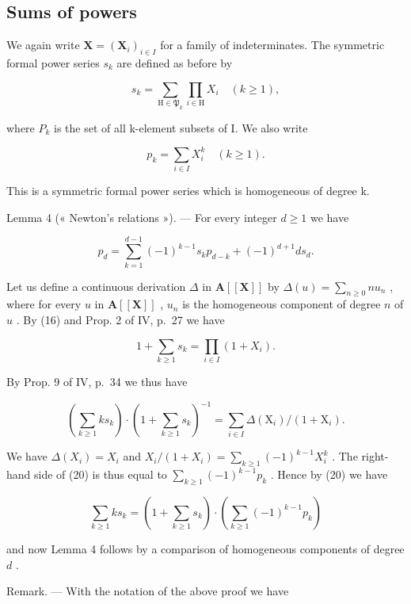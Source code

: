 \subsection{Sums of powers}

We again write \(\mathbf{X} = (\mathbf{X}_{i})_{i \in I}\) for a family of indeterminates. The symmetric formal power series \(s_{k}\) are defined as before by

\[
s _ {k} = \sum_ {\mathrm{H} \in \mathfrak {P} _ {k}} \prod_ {i \in \mathrm{H}} X _ {i} \quad (k \geqslant 1),\tag{16}
\]

where \(P_{k}\) is the set of all k-element subsets of I. We also write

\[
p _ {k} = \sum_ {i \in I} X _ {i} ^ {k} \quad (k \geqslant 1).\tag{17}
\]

This is a symmetric formal power series which is homogeneous of degree k.

Lemma 4 (« Newton's relations »). --- For every integer \(d \geqslant 1\) we have

\[
p _ {d} = \sum_ {k = 1} ^ {d - 1} (- 1) ^ {k - 1} s _ {k} p _ {d - k} + (- 1) ^ {d + 1} d s _ {d}.\tag{18}
\]

Let us define a continuous derivation \(\Delta\) in \(\mathbf{A}[[\mathbf{X}]]\) by \(\Delta(u) = \sum_{n \geq 0} nu_n\) , where for every \(u\) in \(\mathbf{A}[[\mathbf{X}]]\) , \(u_n\) is the homogeneous component of degree \(n\) of \(u\) . By (16) and Prop. 2 of IV, p.~27 we have

\[
1 + \sum_ {k \geqslant 1} s _ {k} = \prod_ {i \in I} (1 + X _ {i}).\tag{19}
\]

By Prop. 9 of IV, p.~34 we thus have

\[
\left(\sum_ {k \geqslant 1} k s _ {k}\right) \cdot \left(1 + \sum_ {k \geqslant 1} s _ {k}\right) ^ {- 1} = \sum_ {i \in I} \Delta \left(\mathrm{X} _ {i}\right) / \left(1 + \mathrm{X} _ {i}\right).\tag{20}
\]

We have \(\Delta(X_i) = X_i\) and \(X_i / (1 + X_i) = \sum_{k \geq 1} (-1)^{k-1} X_i^k\) . The right-hand side of (20) is thus equal to \(\sum_{k \geq 1} (-1)^{k-1} p_k\) . Hence by (20) we have

\[
\sum_ {k \geqslant 1} k s _ {k} = \left(1 + \sum_ {k \geqslant 1} s _ {k}\right) \cdot \left(\sum_ {k \geqslant 1} (- 1) ^ {k - 1} p _ {k}\right)
\]

and now Lemma 4 follows by a comparison of homogeneous components of degree \(d\) .

Remark. --- With the notation of the above proof we have

